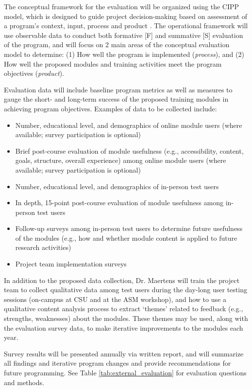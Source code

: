 \documentclass[pdftex,english,11.5pt,parskip=half]{scrartcl}
\begin{document}
The conceptual framework for the evaluation will be organized using the CIPP model, which is designed to guide project decision-making based on assessment of a program’s context, input, process and product \cite{stufflebeam2004cipp}. The operational framework will use observable data to conduct both formative [F] and summative [S] evaluation of the program, and will focus on 2 main areas of the conceptual evaluation model to determine: (1) How well the program is implemented (\textit{process}), and (2) How well the proposed modules and training activities meet the program objectives (\textit{product}).

Evaluation data will include baseline program metrics as well as measures to gauge the short- and long-term success of the proposed training modules in achieving program objectives. Examples of data to be collected include:

\begin{itemize}
\item Number, educational level, and demographics of online module users (where available; survey participation is optional)
\item Brief post-course evaluation of module usefulness (e.g., accessibility, content, goals, structure, overall experience) among online module users (where available; survey participation is optional)
\item Number, educational level, and demographics of in-person test users
\item In depth, 15-point post-course evaluation of module usefulness among in-person test users
\item Follow-up surveys among in-person test users to determine future usefulness of the modules (e.g., how and whether module content is applied to future research activities)
\item Project team implementation surveys
\end{itemize}

In addition to the proposed data collection, Dr. Maertens will train the project team to collect qualitative data among test users during the day-long user testing sessions (on-campus at CSU and at the ASM workshop), and how to use a qualitative content analysis process to extract ‘themes’ related to feedback (e.g., strengths, weaknesses) about the modules. These themes may be used, along with the evaluation survey data, to make iterative improvements to the modules each year.

Survey results will be presented annually via written report, and will summarize all findings and iterative program changes and provide recommendations for future programming. See Table \ref*{tab:external_evaluation} for evaluation questions and methods.
\end{document}
